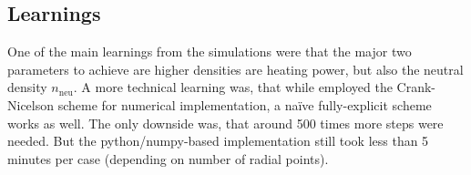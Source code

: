 

\subsection{Learnings}

One of the main learnings from the simulations were that the major two parameters to achieve are higher densities are heating power, but also the neutral density $n_\mathrm{neu}$.
A more technical learning was, that while \cite{birkenmaierModeling2008} employed the Crank-Nicelson scheme for numerical implementation, a naïve fully-explicit scheme works as well.
The only downside was, that around 500 times more steps were needed.
But the python/numpy-based implementation still took less than 5 minutes per case (depending on number of radial points).
